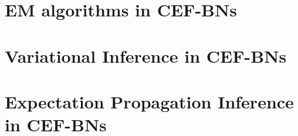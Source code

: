 \documentclass[11pt, oneside]{article}   	%
\newcommand{\bm}{\mathbf}
\numberwithin{figure}{section}
\numberwithin{equation}{section}
\numberwithin{table}{section}
\theoremstyle{definition}
\begin{document}
%
%
%
%
%


\section{EM algorithms in CEF-BNs}

\section{Variational Inference in CEF-BNs}

\section{Expectation  Propagation Inference in CEF-BNs}
\end{document}
